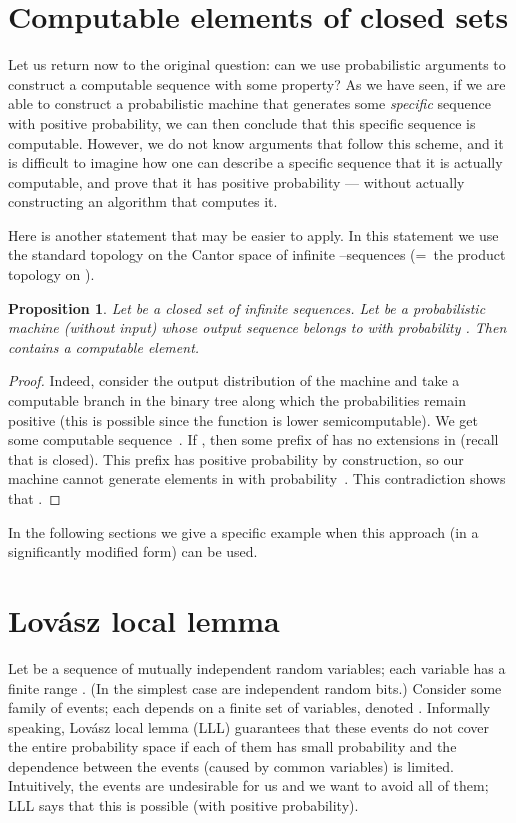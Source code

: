 \documentclass[12pt]{article}
\newtheorem{proposition}{Proposition}
\begin{document}
\section{Computable elements of closed sets}

Let us return now to the original question: can we use probabilistic arguments to construct a computable sequence with some property? As we have seen, if we are able to construct a probabilistic machine that generates some \emph{specific} sequence with positive probability, we can then conclude that this specific sequence is computable. However, we do not know arguments that follow this scheme, and it is difficult to imagine how one can describe a specific sequence that it is actually computable, and prove that it has positive probability --- without actually constructing an algorithm that computes it.

Here is another statement that may be easier to apply. In this statement we use the standard topology on the Cantor space of infinite --sequences (=~the product topology on ).

\begin{proposition}\label{closed-almost-everywhere}
Let  be a closed set of infinite sequences. Let  be a probabilistic machine \textup(without input\textup) whose output sequence belongs to  with probability . Then  contains a computable element.
\end{proposition}

\begin{proof}
Indeed, consider the output distribution  of the machine  and take a computable branch in the binary tree along which the probabilities  remain positive (this is possible since the function  is lower semicomputable). We get some computable sequence~. If , then some prefix of  has no extensions in  (recall that  is closed). This prefix has positive probability by construction, so our machine cannot generate elements in  with probability~. This contradiction shows that .
\end{proof}

In the following sections we give a specific example when this approach (in a significantly modified form) can be used.

\section{Lov\'asz local lemma}

Let  be a sequence of mutually independent random variables; each variable  has a finite range . (In the simplest case  are independent random bits.) Consider some family  of events; each  depends on a finite set of variables, denoted .   Informally speaking, Lov\'asz local lemma (LLL) guarantees that these events do not cover the entire probability space if each of them has small probability and the dependence between the events (caused by common variables) is limited. Intuitively, the events are undesirable for us and we want to avoid all of them; LLL says that this is possible (with positive probability).
\end{document}
